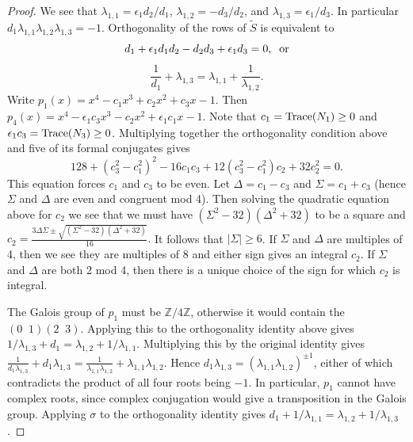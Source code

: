 \documentclass[12pt,psamsfonts]{amsart}
\newcommand{\e}{{\epsilon}}
\newcommand{\Z}{\mathbb Z}
\numberwithin{equation}{section}
\theoremstyle{definition}
\begin{document}
\begin{proof}
We see that $\lambda_{1,1}=\e_1 d_2/d_1$,
$\lambda_{1,2}=-d_3/d_2$, and $\lambda_{1,3}=\e_1/d_3$. In
particular $d_1\lambda_{1,1}\lambda_{1,2}\lambda_{1,3}=-1$.
Orthogonality of the rows of $\tilde S$ is equivalent to
$$d_1+\e_1 d_1 d_2 - d_2 d_3 +\e_1 d_3=0,\;\;{\rm or}$$
$$\frac{1}{d_1}+\lambda_{1,3}=\lambda_{1,1}+\frac{1}{\lambda_{1,2}}.$$
Write $p_1(x)=x^4 -c_1 x^3 + c_2 x^2 + c_3 x-1$. Then $p_4(x)=x^4
-\e_1 c_3 x^3 - c_2 x^2 + \e_1 c_1 x -1.$ Note that $c_1={\rm
Trace}(N_1)\ge 0$ and $\e_1 c_3={\rm Trace}(N_3)\ge 0$.
Multiplying together the orthogonality condition above and five of
its formal conjugates gives
$$128 + (c_3^2-c_1^2)^2 -16 c_1 c_3 + 12 (c_3^2-c_1^2)c_2 + 32 c_2^2=0.$$
This equation forces $c_1$ and $c_3$ to be even. Let
$\Delta=c_1-c_3$ and $\Sigma=c_1+c_3$ (hence $\Sigma$ and $\Delta$
are even and congruent mod 4). Then solving the quadratic equation
above for $c_2$ we see that we must have
$(\Sigma^2-32)(\Delta^2+32)$ to be a square and
$c_2=\frac{3\Delta\Sigma \pm {\sqrt {(\Sigma^2-32)(\Delta^2+32)}}}{16}.$
It follows that $\vert \Sigma\vert \ge 6$. If $\Sigma$ and
$\Delta$ are multiples of 4, then we see they are multiples of 8
and either sign gives an integral $c_2$. If $\Sigma$ and $\Delta$
are both 2 mod 4, then there is a unique choice of the sign for
which $c_2$ is integral.

The Galois group of $p_1$ must be $\Z/4\Z$, otherwise it would
contain the $(0\;\; 1)(2\;\; 3)$. Applying this to the
orthogonality identity above gives
$1/\lambda_{1,3}+d_1=\lambda_{1,2}+1/\lambda_{1,1}$. Multiplying
this by the original identity gives
$\frac{1}{d_1\lambda_{1,3}}+d_1\lambda_{1,3}=
\frac{1}{\lambda_{1,1}\lambda_{1,2}}+\lambda_{1,1}\lambda_{1,2}.$
Hence $d_1\lambda_{1,3}=(\lambda_{1,1}\lambda_{1,2})^{\pm 1}$,
either of which contradicts the product of all four roots being
$-1$. In particular, $p_1$ cannot have complex roots, since
complex conjugation would give a transposition in the Galois
group. Applying $\sigma$ to the orthogonality identity gives
$d_1+1/\lambda_{1,1}=\lambda_{1,2}+1/\lambda_{1,3}$.


\end{proof}
\end{document}
